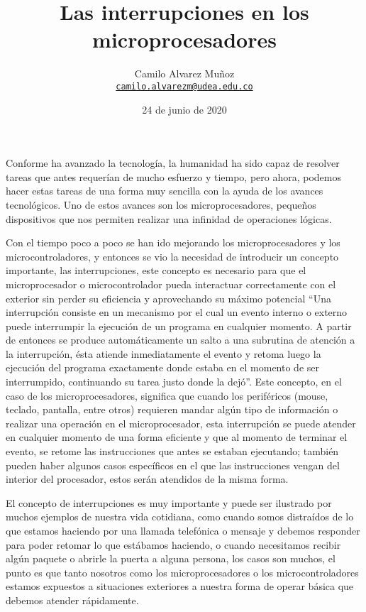 \documentclass[11pt]{article}
\title{Las interrupciones en los microprocesadores}
\date{24 de junio de 2020}
\author{Camilo Alvarez Muñoz\\
\href{mailto:camilo.alvarezm@udea.edu.co}{\texttt{camilo.alvarezm@udea.edu.co}}}
\begin{document}
{
\maketitle}
Conforme ha avanzado la tecnología, la humanidad ha sido capaz de resolver tareas que antes requerían de mucho esfuerzo y tiempo, pero ahora, podemos hacer estas tareas de una forma muy sencilla con la ayuda de los avances tecnológicos. Uno de estos avances son los microprocesadores, pequeños dispositivos que nos permiten realizar una infinidad de operaciones lógicas.

Con el tiempo poco a poco se han ido mejorando los microprocesadores y los microcontroladores, y entonces se vio la necesidad de introducir un concepto importante, las interrupciones, este concepto es necesario para que el microprocesador o microcontrolador pueda interactuar correctamente con el exterior sin perder su eficiencia y aprovechando su máximo potencial “Una interrupción consiste en un mecanismo por el cual un evento interno o externo puede interrumpir la ejecución de un programa en cualquier momento. A partir de entonces se produce automáticamente un salto a una subrutina de atención a la interrupción, ésta atiende inmediatamente el evento y retoma luego la ejecución del programa exactamente donde estaba en el momento de ser interrumpido, continuando su tarea justo donde la dejó”\cite{apaza2017microcontroladores}. Este concepto, en el caso de los microprocesadores, significa que cuando los periféricos (mouse, teclado, pantalla, entre otros) requieren mandar algún tipo de información o realizar una operación en el microprocesador, esta interrupción se puede atender en cualquier momento de una forma eficiente y que al momento de terminar el evento, se retome las instrucciones que antes se estaban ejecutando; también pueden haber algunos casos específicos en el que las instrucciones vengan del interior del procesador, estos serán atendidos de la misma forma.


El concepto de interrupciones es muy importante y puede ser ilustrado por muchos ejemplos de nuestra vida cotidiana, como cuando somos distraídos de lo que estamos haciendo por una llamada telefónica o mensaje y debemos responder para poder retomar lo que estábamos haciendo, o cuando necesitamos recibir algún paquete o abrirle la puerta a alguna persona, los casos son muchos, el punto es que tanto nosotros como los microprocesadores o los microcontroladores estamos expuestos a situaciones exteriores a nuestra forma de operar básica que debemos atender rápidamente.
\end{document}
